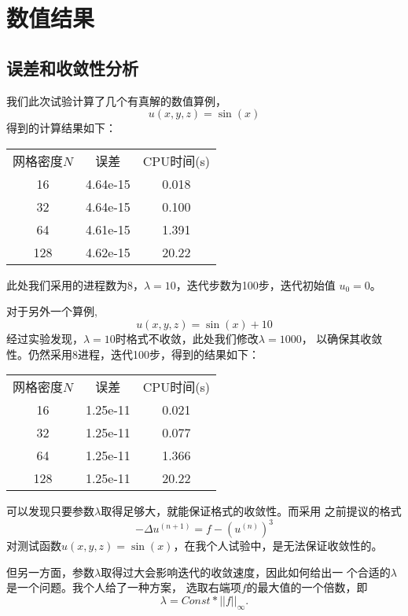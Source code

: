 \documentclass[a4paper,  11pt]{ctexart}
\begin{document}
\section{数值结果}
\subsection{误差和收敛性分析}
我们此次试验计算了几个有真解的数值算例，
\begin{equation}
	\label{eq:example1}
    u(x,y,z) = \sin(x) 
\end{equation}
得到的计算结果如下：
\begin{table}[H]
	\centering
	\begin{tabular}{ccc}
		\hline 
		网格密度$N$ & 误差 & CPU时间(s) \\
		16 & 4.64e-15 & 0.018 \\
		32 & 4.64e-15 & 0.100 \\
		64 & 4.61e-15 & 1.391 \\
		128 & 4.62e-15 & 20.22 \\ 
		\hline
	\end{tabular}
\end{table}
此处我们采用的进程数为8，$\lambda=10$，迭代步数为100步，迭代初始值
$u_0=0$。

对于另外一个算例,
\begin{equation}
	u(x,y,z)=\sin(x)+10
\end{equation}
经过实验发现，$\lambda=10$时格式不收敛，此处我们修改$\lambda = 1000$，
以确保其收敛性。仍然采用8进程，迭代100步，得到的结果如下：
\begin{table}[H]
	\centering
	\begin{tabular}{ccc}
		\hline
		网格密度$N$ & 误差 & CPU时间(s) \\
		16 & 1.25e-11 & 0.021 \\
		32 & 1.25e-11 & 0.077 \\
		64 & 1.25e-11 & 1.366 \\
		128 & 1.25e-11 & 20.22 \\
		\hline 
	\end{tabular}
\end{table}
可以发现只要参数$\lambda$取得足够大，就能保证格式的收敛性。而采用
之前提议的格式
\begin{equation}
	\label{eq:iteration2}
	-\Delta u^{(n+1)} = f - (u^{(n)})^3
\end{equation}
对测试函数$u(x,y,z)=\sin(x)$，在我个人试验中，是无法保证收敛性的。

但另一方面，参数$\lambda$取得过大会影响迭代的收敛速度，因此如何给出一
个合适的$\lambda$是一个问题。我个人给了一种方案，
选取右端项$f$的最大值的一个倍数，即
$$\lambda =Const * ||f||_{\infty}. $$
\end{document}
